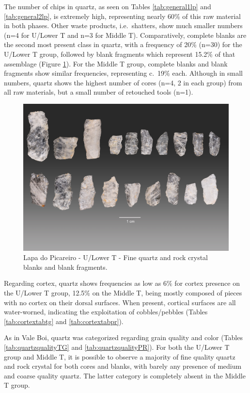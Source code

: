 \documentclass[12pt,twoside]{reedthesis}
\begin{document}
The number of chips in quartz, as seen on Tables \ref{tab:general1lp} and \ref{tab:general2lp}, is extremely high, representing nearly 60\% of this raw material in both phases. Other waste products, i.e.~shatters, show much smaller numbers (n=4 for U/Lower T and n=3 for Middle T). Comparatively, complete blanks are the second most present class in quartz, with a frequency of 20\% (n=30) for the U/Lower T group, followed by blank fragments which represent 15.2\% of that assemblage (Figure \ref{fig:quartzbladelet}). For the Middle T group, complete blanks and blank fragments show similar frequencies, representing c.~19\% each. Although in small numbers, quartz shows the highest number of cores (n=4, 2 in each group) from all raw materials, but a small number of retouched tools (n=1).
\begin{figure}[H]

{\centering \includegraphics[width=0.6\linewidth]{figure/prancha_bladelets} 

}

\caption{Lapa do Picareiro - U/Lower T - Fine quartz and rock crystal blanks and blank fragments.}\label{fig:quartzbladelet}
\end{figure}
Regarding cortex, quartz shows frequencies as low as 6\% for cortex presence on the U/Lower T group, 12.5\% on the Middle T, being mostly composed of pieces with no cortex on their dorsal surfaces. When present, cortical surfaces are all water-worned, indicating the exploitation of cobbles/pebbles (Tables \ref{tab:cortextabtg} and \ref{tab:cortextabpr}).

As in Vale Boi, quartz was categorized regarding grain quality and color (Tables \ref{tab:quartzqualityTG} and \ref{tab:quartzqualityPR}). For both the U/Lower T group and Middle T, it is possible to observe a majority of fine quality quartz and rock crystal for both cores and blanks, with barely any presence of medium and coarse quality quartz. The latter category is completely absent in the Middle T group.
\end{document}
